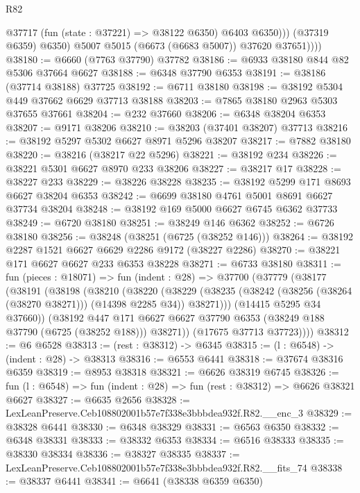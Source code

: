 \begin{lexlean}{R82}
\begin{coremodule}
                  @37717 (fun (state : @37221) => @38122 @6350) @6403 @6350)))
              (@37319 @6359)
              @6350)
            @5007
            @5015
            (@6673 (@6683 @5007))
            @37620
            @37651))))
@38180 := @6660 (@7763 @37790) @37782
@38186 := @6933 @38180 @844 @82 @5306 @37664 @6627
@38188 := @6348 @37790 @6353
@38191 := @38186 (@37714 @38188) @37725
@38192 := @6711 @38180
@38198 := @38192 @5304 @449 @37662 @6629 @37713 @38188
@38203 := @7865 @38180 @2963 @5303 @37655 @37661
@38204 := @232 @37660
@38206 := @6348 @38204 @6353
@38207 := @9171 @38206
@38210 := @38203 (@37401 @38207) @37713
@38216 := @38192 @5297 @5302 @6627 @8971 @5296 @38207
@38217 := @7882 @38180
@38220 := @38216 (@38217 @22 @5296)
@38221 := @38192 @234
@38226 := @38221 @5301 @6627 @8970 @233 @38206
@38227 := @38217 @17
@38228 := @38227 @233
@38229 := @38226 @38228
@38235 := @38192 @5299 @171 @8693 @6627 @38204 @6353
@38242 := @6699 @38180 @4761 @5001 @8691 @6627 @37734 @38204
@38248 := @38192 @169 @5000 @6627 @6745 @6362 @37733
@38249 := @6720 @38180
@38251 := @38249 @146 @6362
@38252 := @6726 @38180
@38256 := @38248 (@38251 (@6725 (@38252 @146)))
@38264 := @38192 @2287 @1521 @6627 @6629 @2286 @9172 (@38227 @2286)
@38270 := @38221 @171 @6627 @6627 @233 @6353 @38228
@38271 := @6733 @38180
@38311 := fun (pieces : @18071) =>
  fun (indent : @28) =>
  @37700
    (@37779
      (@38177
        (@38191
          (@38198
            (@38210
              (@38220
                (@38229
                  (@38235 (@38242 (@38256 (@38264 (@38270 @38271))) (@14398 @2285 @34)) @38271)))
              (@14415 @5295 @34 @37660))
            (@38192
              @447
              @171
              @6627
              @6627
              @37790
              @6353
              (@38249 @188 @37790 (@6725 (@38252 @188)))
              @38271))
          (@17675 @37713 @37723))))
@38312 := @6 @6528
@38313 := (rest : @38312) -> @6345
@38315 := (l : @6548) -> (indent : @28) -> @38313
@38316 := @6553 @6441
@38318 := @37674 @38316 @6359
@38319 := @8953 @38318
@38321 := @6626 @38319 @6745
@38326 := fun (l : @6548) => fun (indent : @28) => fun (rest : @38312) => @6626 @38321 @6627
@38327 := @6635 @2656
@38328 := LexLeanPreserve.Ceb108802001b57e7f338e3bbbdea932f.R82.__enc_3
@38329 := @38328 @6441
@38330 := @6348 @38329
@38331 := @6563 @6350
@38332 := @6348 @38331
@38333 := @38332 @6353
@38334 := @6516 @38333
@38335 := @38330 @38334
@38336 := @38327 @38335
@38337 := LexLeanPreserve.Ceb108802001b57e7f338e3bbbdea932f.R82.__fits_74
@38338 := @38337 @6441
@38341 := @6641 (@38338 @6359 @6350)

\end{coremodule}
\end{lexlean}

